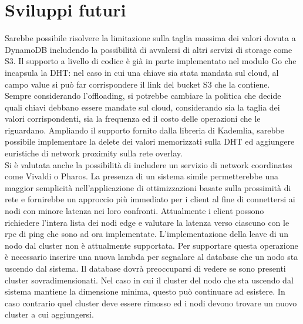 \documentclass[conference]{IEEEtran}
\begin{document}
\section{Sviluppi futuri}
Sarebbe possibile risolvere la limitazione sulla taglia massima dei valori dovuta a DynamoDB includendo la possibilità di
avvalersi di altri servizi di storage come S3. Il supporto a livello di codice è già in parte implementato nel modulo Go
che incapsula la DHT: nel caso in cui una chiave sia stata mandata sul cloud, al campo value si può far corrispondere il
link del bucket S3 che la contiene.\\
Sempre considerando l'offloading, si potrebbe cambiare la politica che decide quali chiavi debbano essere mandate sul cloud,
considerando sia la taglia dei valori corrispondenti, sia la frequenza ed il costo delle operazioni che le riguardano.
Ampliando il supporto fornito dalla libreria di Kademlia, sarebbe possibile implementare la delete dei valori memorizzati
sulla DHT ed aggiungere euristiche di network proximity sulla rete overlay.\cite{kadRTT}\\
Si è valutata anche la possibilità di includere un servizio di network coordinates come Vivaldi\cite{vivaldi} o Pharos.\cite{pharos}
La presenza di un sistema simile permetterebbe una maggior semplicità nell'applicazione di ottimizzazioni basate sulla
prossimità di rete e fornirebbe un approccio più immediato per i client al fine di connettersi ai nodi con minore latenza
nei loro confronti. Attualmente i client possono richiedere l'intera lista dei nodi edge e valutare la latenza verso ciascuno
con le rpc di ping che sono ad ora implementate.
L'implementazione della leave di un nodo dal cluster non è attualmente supportata. Per supportare questa operazione è necessario
inserire una nuova lambda per segnalare al database che un nodo sta uscendo dal sistema. Il database dovrà preoccuparsi di vedere se
sono presenti cluster sovradimensionati. Nel caso in cui il cluster del nodo che sta uscendo dal sistema mantiene la dimensione minima, questo
può continuare ad esistere.
In caso contrario quel cluster deve essere rimosso ed i nodi devono trovare un nuovo cluster a cui aggiungersi.
\end{document}
